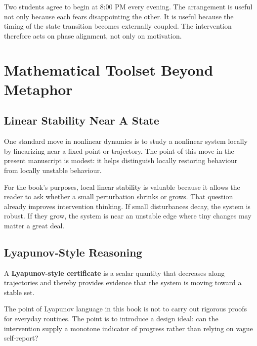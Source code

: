\begin{example}
Two students agree to begin at 8:00 PM every evening. The arrangement is useful
not only because each fears disappointing the other. It is useful because the
timing of the state transition becomes externally coupled. The intervention
therefore acts on phase alignment, not only on motivation.
\end{example}

\section{Mathematical Toolset Beyond Metaphor}

\subsection{Linear Stability Near A State}

One standard move in nonlinear dynamics is to study a nonlinear system locally
by linearizing near a fixed point or trajectory. The point of this move in the
present manuscript is modest: it helps distinguish locally restoring behaviour
from locally unstable behaviour.

\begin{remark}
For the book's purposes, local linear stability is valuable because it allows
the reader to ask whether a small perturbation shrinks or grows. That question
already improves intervention thinking. If small disturbances decay, the system
is robust. If they grow, the system is near an unstable edge where tiny changes
may matter a great deal.
\end{remark}

\subsection{Lyapunov-Style Reasoning}

\begin{definition}
A \textbf{Lyapunov-style certificate} is a scalar quantity that decreases along
trajectories and thereby provides evidence that the system is moving toward a
stable set.
\end{definition}

The point of Lyapunov language in this book is not to carry out rigorous proofs
for everyday routines. The point is to introduce a design ideal: can the
intervention supply a monotone indicator of progress rather than relying on
vague self-report?

